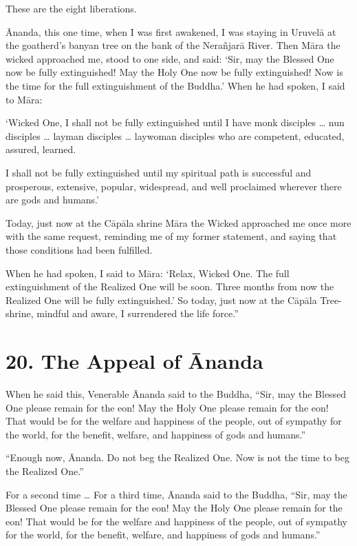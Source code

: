 \documentclass[12pt,openany]{book}%
\begin{document}
These are the eight liberations. 

Ānanda, this one time, when I was first awakened, I was staying in \textsanskrit{Uruvelā} at the goatherd’s banyan tree on the bank of the \textsanskrit{Nerañjarā} River. Then \textsanskrit{Māra} the wicked approached me, stood to one side, and said: ‘Sir, may the Blessed One now be fully extinguished! May the Holy One now be fully extinguished! Now is the time for the full extinguishment of the Buddha.’ When he had spoken, I said to \textsanskrit{Māra}: 

‘Wicked One, I shall not be fully extinguished until I have monk disciples … nun disciples … layman disciples … laywoman disciples who are competent, educated, assured, learned. 

I shall not be fully extinguished until my spiritual path is successful and prosperous, extensive, popular, widespread, and well proclaimed wherever there are gods and humans.’ 

Today, just now at the \textsanskrit{Cāpāla} shrine \textsanskrit{Māra} the Wicked approached me once more with the same request, reminding me of my former statement, and saying that those conditions had been fulfilled. 

When he had spoken, I said to \textsanskrit{Māra}: ‘Relax, Wicked One. The full extinguishment of the Realized One will be soon. Three months from now the Realized One will be fully extinguished.’ So today, just now at the \textsanskrit{Cāpāla} Tree-shrine, mindful and aware, I surrendered the life force.” 

\section*{20. The Appeal of Ānanda }

When he said this, Venerable Ānanda said to the Buddha, “Sir, may the Blessed One please remain for the eon! May the Holy One please remain for the eon! That would be for the welfare and happiness of the people, out of sympathy for the world, for the benefit, welfare, and happiness of gods and humans.” 

“Enough now, Ānanda. Do not beg the Realized One. Now is not the time to beg the Realized One.” 

For a second time … For a third time, Ānanda said to the Buddha, “Sir, may the Blessed One please remain for the eon! May the Holy One please remain for the eon! That would be for the welfare and happiness of the people, out of sympathy for the world, for the benefit, welfare, and happiness of gods and humans.” 
\end{document}

